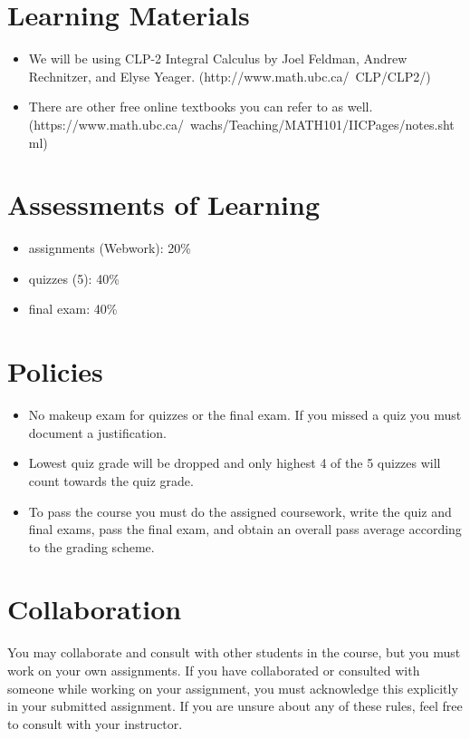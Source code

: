 \documentclass[12pt,usletter]{article} %
\begin{document}
\section*{Learning Materials}
\begin{itemize}
  \item We will be using CLP-2 Integral Calculus by Joel Feldman, Andrew Rechnitzer, and Elyse Yeager. (http://www.math.ubc.ca/~CLP/CLP2/)
  \item There are other free online textbooks you can refer to as well. \newline (https://www.math.ubc.ca/~wachs/Teaching/MATH101/IICPages/notes.shtml)
\end{itemize}

\section*{Assessments of Learning}
\begin{itemize}
  \item assignments (Webwork): 20\%
  \item quizzes (5): 40\%
  \item final exam: 40\%
\end{itemize}

\section*{Policies}
\begin{itemize}
  \item No makeup exam for quizzes or the final exam. If you missed a quiz you must document a justification.
  \item Lowest quiz grade will be dropped and only highest 4 of the 5 quizzes will count towards the quiz grade.
  \item To pass the course you must do the assigned coursework, write the quiz and final exams, pass the final exam, and obtain an overall pass average according to the grading scheme.
\end{itemize}

\section*{Collaboration}
You may collaborate and consult with other students in the course, but you must work on your own assignments. If you have collaborated or consulted with someone while working on your assignment, you must acknowledge this explicitly in your submitted assignment. If you are unsure about any of these rules, feel free to consult with your instructor.
\end{document}
